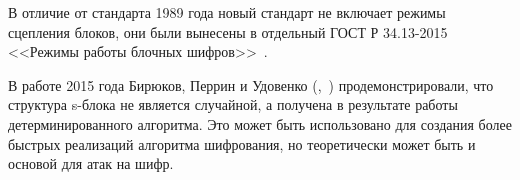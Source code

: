 В отличие от стандарта 1989 года новый стандарт не включает режимы сцепления блоков, они были вынесены в отдельный ГОСТ Р 34.13-2015 <<Режимы работы блочных шифров>>~\cite{GOST-R:34.13-2015}.

В работе 2015 года Бирюков, Перрин и Удовенко (,~\cite{Biryukov:Perrin:Udovenko:2015}) продемонстрировали, что структура s-блока не является случайной, а получена в результате работы детерминированного алгоритма. Это может быть использовано для создания более быстрых реализаций алгоритма шифрования, но теоретически может быть и основой для атак на шифр.

